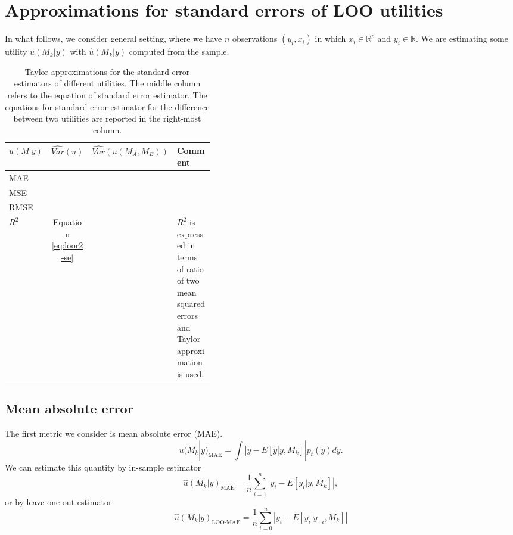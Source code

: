 \documentclass{article}
\begin{document}
\section{Approximations for standard errors of LOO utilities}
In what follows, we consider general setting, where we have $n$ observations $(y_i, x_i)$ in which $x_i \in \mathbb{R}^p$ and $y_i \in \mathbb{R}$. We are estimating some utility $u(M_k | y)$ with $\hat{u}(M_k |y)$ computed from the sample.


\begin{table}[]
    \centering
    \begin{tabular}{l c c p{0.4\linewidth}}
    \toprule
    $u(M | y)$ & $\widehat{Var}(u)$  & $\widehat{Var}(u(M_A, M_B))$ & Comment \\ \midrule
    MAE & & \\
    MSE & & \\
    RMSE  & & \\
    $R^2$ & Equation \eqref{eq:loor2-se} & & $R^2$ is expressed in terms of ratio of two mean squared errors and Taylor approximation is used.
    \end{tabular}
    \caption{Taylor approximations for the standard error estimators of different utilities. The middle column refers to the equation of standard error estimator. The equations for standard error estimator for the difference between two utilities are reported in the right-most column.}
    \label{tbl:se-approximations}
\end{table}

\subsection{Mean absolute error}
The first metric we consider is mean absolute error (MAE).
\begin{equation}
    u(M_k | y)_{\text{MAE}} = \int \left| \tilde{y} - E\left[ \tilde{y} \right| y, M_k \right] | p_t(\tilde{y}) d\tilde{y}.
\end{equation}
We can estimate this quantity by in-sample estimator
\begin{equation}
    \hat{u}(M_k | y)_{\text{MAE}} = \frac{1}{n} \sum_{i=1}^n \left| y_i - E\left[ y_i | y, M_k \right] \right|,
\end{equation}
or by leave-one-out estimator
\begin{equation}
    \hat{u}(M_k | y)_{\text{LOO-MAE}} = \frac{1}{n} \sum_{i=0}^n \left| y_i - E\left[ y_i | y_{-i}, M_k \right] \right|
\end{equation}
\end{document}
